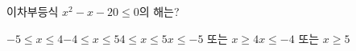 \hspace*{2mm}\begin{minipage}[t]{\dimexpr\linewidth-2mm\relax}\vspace{0pt}
이차부등식 $x^2-x-20\le 0$의 해는?
\begin{choicesii}{$-5\le x\le 4$}{$-4\le x\le 5$}{$4\le x\le 5$}{$x\le -5$ 또는 $x\ge 4$}{$x\le -4$ 또는 $x\ge 5$}\end{choicesii}\end{minipage}
